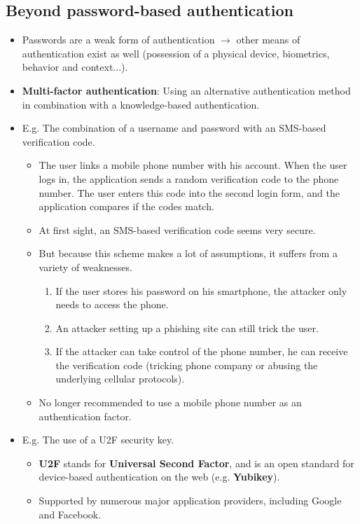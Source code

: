 \documentclass[../main.tex]{subfiles}
\begin{document}
\subsection{Beyond password-based authentication}
\begin{itemize}
\item Passwords are a weak form of authentication $\rightarrow$ other means of authentication exist as well (possession of a physical device, biometrics, behavior and context...).
\item \textbf{Multi-factor authentication}: Using an alternative authentication method in combination with a knowledge-based authentication.
\item E.g. The combination of a username and password with an SMS-based verification code.
\begin{itemize}
\item The user links a mobile phone number with his account. When the user logs in, the application sends a random verification code to the phone number. The user enters this code into the second login form, and the application compares if the codes match.
\item At first sight, an SMS-based verification code seems very secure.
\item But because this scheme makes a lot of assumptions, it suffers from a variety of weaknesses.
\begin{enumerate}
\item If the user stores his password on his smartphone, the attacker only needs to access the phone.
\item An attacker setting up a phishing site can still trick the user.
\item If the attacker can take control of the phone number, he can receive the verification code (tricking phone company or abusing the underlying cellular protocols).
\end{enumerate}
\item No longer recommended to use a mobile phone number as an authentication factor.
\end{itemize}
\item E.g. The use of a U2F security key.
\begin{itemize}
\item \textbf{U2F} stands for \textbf{Universal Second Factor}, and is an open standard for device-based authentication on the web (e.g. \textbf{Yubikey}).
\item Supported by numerous major application providers, including Google and Facebook.

\end{itemize}
\end{itemize}
\end{document}
